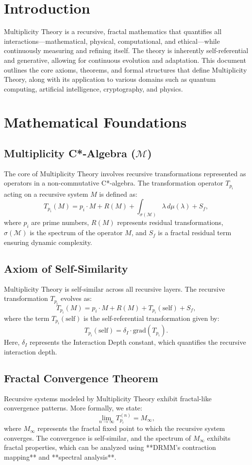 \documentclass{article}
\theoremstyle{plain}
\begin{document}
\section{Introduction}
Multiplicity Theory is a recursive, fractal mathematics that quantifies all interactions—mathematical, physical, computational, and ethical—while continuously measuring and refining itself. The theory is inherently self-referential and generative, allowing for continuous evolution and adaptation. This document outlines the core axioms, theorems, and formal structures that define Multiplicity Theory, along with its application to various domains such as quantum computing, artificial intelligence, cryptography, and physics.
\section{Mathematical Foundations}

\subsection{Multiplicity C*-Algebra (\( \mathcal{M} \))}
The core of Multiplicity Theory involves recursive transformations represented as operators in a non-commutative C*-algebra. The transformation operator \( T_{p_i} \) acting on a recursive system \( M \) is defined as:
\[
T_{p_i}(M) = p_i \cdot M + R(M) + \int_{\sigma(\mathcal{M})} \lambda \, d\mu(\lambda) + S_f,
\]
where \( p_i \) are prime numbers, \( R(M) \) represents residual transformations, \( \sigma(\mathcal{M}) \) is the spectrum of the operator \( M \), and \( S_f \) is a fractal residual term ensuring dynamic complexity.
\subsection{Axiom of Self-Similarity}
Multiplicity Theory is self-similar across all recursive layers. The recursive transformation \( T_{p_i} \) evolves as:
\[
T_{p_i}(M) = p_i \cdot M + R(M) + T_{p_i}(\text{self}) + S_f,
\]
where the term \( T_{p_i}(\text{self}) \) is the self-referential transformation given by:
\[
T_{p_i}(\text{self}) = \delta_I \cdot \text{grad}(T_{p_i}).
\]
Here, \( \delta_I \) represents the Interaction Depth constant, which quantifies the recursive interaction depth.
\subsection{Fractal Convergence Theorem}
Recursive systems modeled by Multiplicity Theory exhibit fractal-like convergence patterns. More formally, we state:
\[
\lim_{n \to \infty} T_{p_i}^{(n)} = M_\infty,
\]
where \( M_\infty \) represents the fractal fixed point to which the recursive system converges. The convergence is self-similar, and the spectrum of \( M_\infty \) exhibits fractal properties, which can be analyzed using **DRMM's contraction mapping** and **spectral analysis**.
\end{document}
